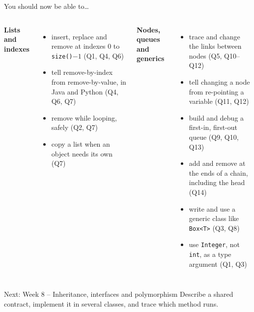 \documentclass[aspectratio=169]{beamer}
\newcommand{\code}[1]{\texttt{#1}}
\newcommand{\neutrallabel}[1]{\textcolor{bkblue}{\textbf{#1}}}
\newcommand{\yes}{\textcolor{goodgreen}{\ding{51}}}
\begin{document}
\begin{frame}{You should now be able to\ldots}
  \begin{columns}[T,onlytextwidth]
    \neutrallabel{Lists and indexes}
    \begin{itemize}[itemsep=0.02em, topsep=0.1em]
      \footnotesize
      \item[\yes] insert, replace and remove at indexes 0 to \code{size()}$-1$
            (Q1, Q4, Q6)
      \item[\yes] tell remove-by-index from remove-by-value, in Java and Python
            (Q4, Q6, Q7)
      \item[\yes] remove while looping, safely (Q2, Q7)
      \item[\yes] copy a list when an object needs its own (Q7)
    \end{itemize}
    \neutrallabel{Nodes, queues and generics}
    \begin{itemize}[itemsep=0.02em, topsep=0.1em]
      \footnotesize
      \item[\yes] trace and change the links between nodes (Q5, Q10--Q12)
      \item[\yes] tell changing a node from re-pointing a variable (Q11, Q12)
      \item[\yes] build and debug a first-in, first-out queue (Q9, Q10, Q13)
      \item[\yes] add and remove at the ends of a chain, including the head (Q14)
      \item[\yes] write and use a generic class like \code{Box<T>} (Q3, Q8)
      \item[\yes] use \code{Integer}, not \code{int}, as a type argument (Q1, Q3)
    \end{itemize}
  \end{columns}
  \vspace{0.3em}
  \begin{contextbox}{Next: Week 8 -- Inheritance, interfaces and polymorphism}
    \footnotesize Describe a shared contract, implement it in several classes, and
    trace which method runs.
  \end{contextbox}
\end{frame}
\end{document}
